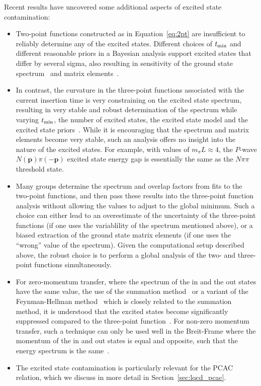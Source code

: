 Recent results have uncovered some additional aspects of excited state contamination:
\begin{itemize}[leftmargin=*]
\item Two-point functions constructed as in Equation~\eqref{eq:2pt} are insufficient to reliably determine any of the excited states.  Different choices of $t_{\rm min}$ and different reasonable priors in a Bayesian analysis support excited states that differ by several sigma, also resulting in sensitivity of the ground state spectrum~\cite{Park:2021ypf,He:2021yvm} and matrix elements~\cite{Jang:2019vkm,Gupta:2021ahb}.

\item In contrast, the curvature in the three-point functions associated with the current insertion time is very constraining on the excited state spectrum, resulting in very stable and robust determination of the spectrum while varying $t_{\rm min}$, the number of excited states, the excited state model and the excited state priors~\cite{He:2021yvm}.
While it is encouraging that the spectrum and matrix elements become very stable, such an analysis offers no insight into the nature of the excited states.  For example, with values of $m_\pi L\approx4$, the $P$-wave $N(\mathbf{p})\pi(-\mathbf{p})$ excited state energy gap is essentially the same as the $N\pi\pi$ threshold state.

\item Many groups determine the spectrum and overlap factors from fits to the two-point functions, and then pass these results into the three-point function analysis without allowing the values to adjust to the global minimum.  Such a choice can either lead to an overestimate of the uncertainty of the three-point functions (if one uses the variablility of the spectrum mentioned above), or a biased extraction of the ground state matrix elements (if one uses the ``wrong'' value of the spectrum).  Given the computational setup described above, the robust choice is to perform a global analysis of the two- and three-point functions simultaneously.

\item For zero-momentum transfer, where the spectrum of the in and the out states have the same value,
the use of the summation method~\cite{Maiani:1987by} or a variant of the Feynman-Hellman method~\cite{deDivitiis:2012vs,Bouchard:2016heu} which is closely related to the summation method, it is understood that the excited states become significantly suppressed compared to the three-point function~\cite{Capitani:2012gj,He:2021yvm}.
For non-zero momentum transfer, such a technique can only be used well in the Breit-Frame where the momentum of the in and out states is equal and opposite, such that the energy spectrum is the same~\cite{Gambhir:2019pvw}.

\item The excited state contamination is particularly relevant for the PCAC relation, which we discuss in more detail in Section~\ref{sec:lqcd_pcac}.


\end{itemize}
